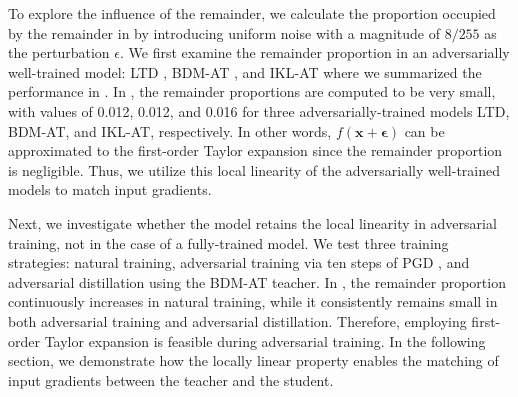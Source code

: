 \documentclass{article} %
\begin{document}
To explore the influence of the remainder, we calculate the proportion occupied by the remainder in  by introducing uniform noise with a magnitude of $8/255$ as the perturbation $\epsilon$.
We first examine the remainder proportion in an adversarially well-trained model: LTD \citep{LTD}, BDM-AT \citep{wang2023better}, and IKL-AT \citep{cui2023decoupled} where we summarized the performance in .
In , the remainder proportions are computed to be very small, with values of 0.012, 0.012, and 0.016 for three adversarially-trained models LTD, BDM-AT, and IKL-AT, respectively.
In other words, $f(\textbf{x} + \boldsymbol{\epsilon})$ can be approximated to the first-order Taylor expansion since the remainder proportion is negligible.
Thus, we utilize this local linearity of the adversarially well-trained models to match input gradients.

Next, we investigate whether the model retains the local linearity in adversarial training, not in the case of a fully-trained model.
We test three training strategies: natural training, adversarial training via ten steps of PGD \citep{PGD}, and adversarial distillation \citep{ard} using the BDM-AT teacher.
In , the remainder proportion continuously increases in natural training, while it consistently remains small in both adversarial training and adversarial distillation.
Therefore, employing first-order Taylor expansion is feasible during adversarial training.
In the following section, we demonstrate how the locally linear property enables the matching of input gradients between the teacher and the student.
\end{document}
